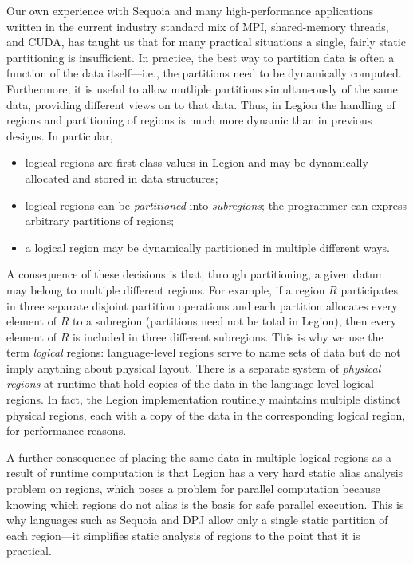 Our own experience with Sequoia and many high-performance applications
written in the current industry standard mix of MPI, shared-memory
threads, and CUDA, has taught us that for many practical situations a
single, fairly static partitioning is insufficient.  In practice, the
best way to partition data is often a function of the data
itself---i.e., the partitions need to be dynamically computed.
Furthermore, it is useful to allow mutliple partitions simultaneously of
the same data, providing different views on to that data. Thus, in Legion the 
handling of regions and partitioning of regions is much more dynamic than in 
previous designs.  In particular,
\begin{itemize}
\item  logical regions are first-class values in Legion
and may be dynamically allocated and stored in data structures;

\item logical regions can be {\em partitioned} into {\em subregions}; the programmer can express arbitrary partitions of
regions;

\item  a logical region may be dynamically partitioned in multiple different ways.
\end{itemize}
A consequence of these decisions is that, through partitioning, a
given datum may belong to multiple different regions.  For example, if
a region $R$ participates in three separate disjoint partition
operations and each partition allocates every element of $R$ to a
subregion (partitions need not be total in Legion), then every element
of $R$ is included in three different subregions.  This is why we use
the term {\em logical} regions: language-level regions serve to name
sets of data but do not imply anything about physical layout.  There
is a separate system of {\em physical regions} at runtime that hold
copies of the data in the language-level logical regions.  In fact,
the Legion implementation routinely maintains multiple distinct
physical regions, each with a copy of the data in the corresponding
logical region, for performance reasons.

A further consequence of placing the same data in multiple logical
regions as a result of runtime computation is that Legion has a very
hard static alias analysis problem on regions, which poses a problem
for parallel computation because knowing which regions do not alias is the
basis for safe parallel execution.  This is why languages such as
Sequoia and DPJ allow only a single static partition of each
region---it simplifies static analysis of regions to the point that it
is practical.  

